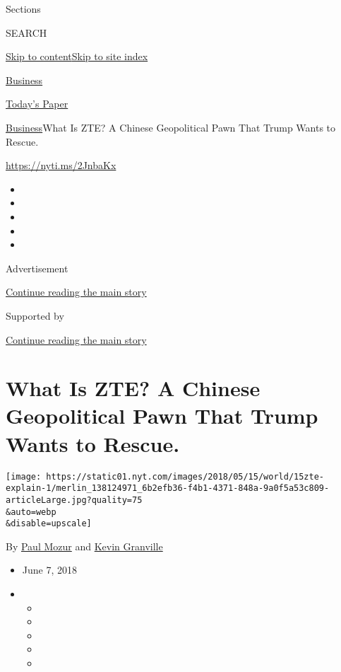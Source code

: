 Sections

SEARCH

\protect\hyperlink{site-content}{Skip to
content}\protect\hyperlink{site-index}{Skip to site index}

\href{https://www.nytimes.com/section/business}{Business}

\href{https://myaccount.nytimes.com/auth/login?response_type=cookie\&client_id=vi}{}

\href{https://www.nytimes.com/section/todayspaper}{Today's Paper}

\href{/section/business}{Business}\textbar{}What Is ZTE? A Chinese
Geopolitical Pawn That Trump Wants to Rescue.

\url{https://nyti.ms/2JnbaKx}

\begin{itemize}
\item
\item
\item
\item
\item
\end{itemize}

Advertisement

\protect\hyperlink{after-top}{Continue reading the main story}

Supported by

\protect\hyperlink{after-sponsor}{Continue reading the main story}

\hypertarget{what-is-zte-a-chinese-geopolitical-pawn-that-trump-wants-to-rescue}{%
\section{What Is ZTE? A Chinese Geopolitical Pawn That Trump Wants to
Rescue.}\label{what-is-zte-a-chinese-geopolitical-pawn-that-trump-wants-to-rescue}}

\texttt{[image: https://static01.nyt.com/images/2018/05/15/world/15zte-explain-1/merlin\_138124971\_6b2efb36-f4b1-4371-848a-9a0f5a53c809-articleLarge.jpg?quality=75\\\&auto=webp\\\&disable=upscale]}

By \href{https://www.nytimes.com/by/paul-mozur}{Paul Mozur} and
\href{https://www.nytimes.com/by/kevin-granville}{Kevin Granville}

\begin{itemize}
\item
  June 7, 2018
\item
  \begin{itemize}
  \item
  \item
  \item
  \item
  \item
  \end{itemize}
\end{itemize}


